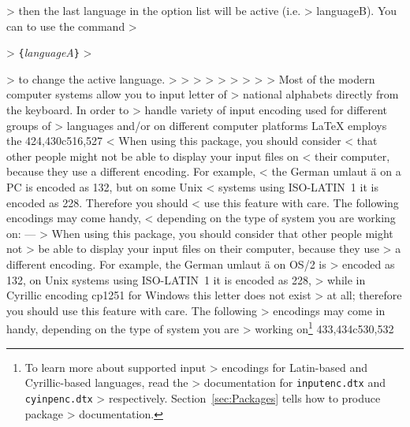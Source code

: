 > \noindent then the last language in the option list will be active (i.e.
> languageB). You can to use the command
> \begin{lscommand}
> \verb|{|\emph{languageA}\verb|}|
> \end{lscommand}
> \noindent to change the active language.
> 
> %
> \newcommand{\ieih}[1]{%
> \index{encodings!input!#1@\texttt{#1}}%
> \index{input encodings!#1@\texttt{#1}}%
> \index{#1@\texttt{#1}}}
> \newcommand{\iei}[1]{%
> \ieih{#1}\texttt{#1}}
> %
> \newcommand{\feih}[1]{%
> \index{encodings!font!#1@\texttt{#1}}%
> \index{font encodings!#1@\texttt{#1}}%
> \index{#1@\texttt{#1}}}
> \newcommand{\fei}[1]{%
> \feih{#1}\texttt{#1}}
> 
> Most of the modern computer systems allow you to input letter of
> national alphabets  directly from the keyboard. In order to 
> handle variety of input encoding used for different groups of 
> languages and/or on different computer platforms \LaTeX{} employs the
424,430c516,527
< When using this package, you should consider
< that other people might not be able to display your input files on
< their computer, because they use a different encoding. For example,
< the German umlaut \"a on a PC is encoded as 132, but on some Unix
< systems using ISO-LATIN~1 it is encoded as 228. Therefore you should
< use this feature with care. The following encodings may come handy,
< depending on the type of system you are working on: 
---
> When using this package, you should consider that other people might not
> be able to display your input files on their computer, because they use
> a different encoding. For example, the German umlaut \"a on OS/2 is
> encoded as 132, on Unix systems using ISO-LATIN~1 it is encoded as 228,
> while in Cyrillic encoding cp1251 for Windows this letter does not exist
> at all; therefore you should use this feature with care. The following
> encodings may come in handy, depending on the type of system you are
> working on\footnote{To learn more about supported  input
> encodings for Latin-based and Cyrillic-based languages, read the
> documentation for \texttt{inputenc.dtx} and \texttt{cyinpenc.dtx}
> respectively. Section~\ref{sec:Packages} tells how to produce package
> documentation.}
433,434c530,532
